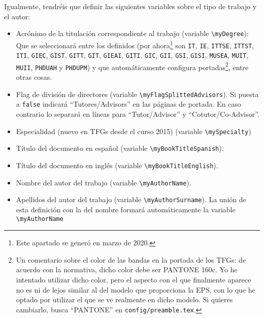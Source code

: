 Igualmente, tendréis que definir las siguientes variables sobre el tipo
de trabajo y el autor:

\begin{itemize} 
\item Acrónimo de la titulación correspondiente al trabajo (variable
  \texttt{\textbackslash{}myDegree}): Que se seleccionará entre los
  definidos (por ahora\footnote{Este apartado se generó en marzo de
    2020.} son \texttt{IT}, \texttt{IE}, \texttt{ITTSE}, \texttt{ITTST},
  \texttt{ITI}, \texttt{GIEC}, \texttt{GIST}, \texttt{GITT},
  \texttt{GIT}, \texttt{GIEAI}, \texttt{GITI}, \texttt{GIC},
  \texttt{GII}, \texttt{GSI}, \texttt{GISI}, \texttt{MUSEA},
  \texttt{MUIT}, \texttt{MUII}, \texttt{PHDUAH} y \texttt{PHDUPM}) y que
  automáticamente configura portadas\footnote{Un comentario sobre el
    color de las bandas en la portada de los TFGs: de acuerdo con la
    normativa, dicho color debe ser PANTONE 160c. Yo he intentado
    utilizar dicho color, pero el aspecto con el que finalmente aparece
    no es ni de lejos similar al del modelo que proporciona la EPS, con
    lo que he optado por utilizar el que se ve realmente en dicho
    modelo. Si quieres cambiarlo, busca ``PANTONE'' en
    \texttt{config/preamble.tex}.}, entre otras cosas.

\item Flag de división de directores (variable
  \texttt{\textbackslash{}myFlagSplittedAdvisors}). Si puesta a
  \texttt{false} indicará ``Tutores/Advisors'' en las páginas de
  portada. En caso contrario lo separará en líneas para
  ``Tutor/Advisor'' y ``Cotutor/Co-Advisor''.

\item Especialidad (nuevo en TFGs desde el curso 2015) (variable
  \texttt{\textbackslash{}mySpecialty})


\item Título del documento en español (variable
  \texttt{\textbackslash{}myBookTitleSpanish}).
\item Título del documento en inglés (variable
  \texttt{\textbackslash{}myBookTitleEnglish}).

\item Nombre del autor del trabajo (variable
  \texttt{\textbackslash{}myAuthorName}).
\item Apellidos del autor del trabajo (variable
  \texttt{\textbackslash{}myAuthorSurname}). La unión de esta
  definición con la del nombre formará automáticamente la variable
  \texttt{\textbackslash{}myAuthorName}


\end{itemize}

